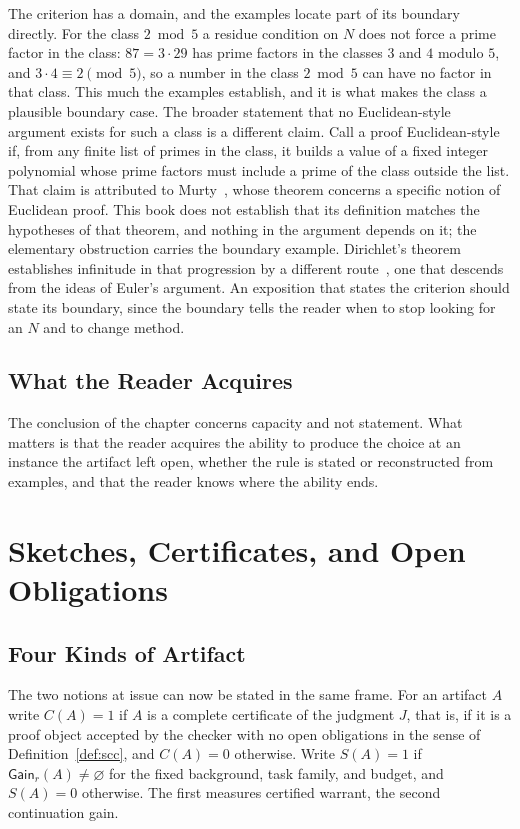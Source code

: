 \documentclass[11pt]{book}
\theoremstyle{definition}
\theoremstyle{remark}
\newcommand{\Gain}{\mathsf{Gain}}
\begin{document}
The criterion has a domain, and the examples locate part of its boundary directly. For the class $2\bmod5$ a residue condition on $N$ does not force a prime factor in the class: $87=3\cdot29$ has prime factors in the classes $3$ and $4$ modulo $5$, and $3\cdot4\equiv2\pmod5$, so a number in the class $2\bmod5$ can have no factor in that class. This much the examples establish, and it is what makes the class a plausible boundary case. The broader statement that no Euclidean-style argument exists for such a class is a different claim. Call a proof Euclidean-style if, from any finite list of primes in the class, it builds a value of a fixed integer polynomial whose prime factors must include a prime of the class outside the list. That claim is attributed to Murty~\cite{murty}, whose theorem concerns a specific notion of Euclidean proof. This book does not establish that its definition matches the hypotheses of that theorem, and nothing in the argument depends on it; the elementary obstruction carries the boundary example. Dirichlet's theorem establishes infinitude in that progression by a different route~\cite{dirichlet}, one that descends from the ideas of Euler's argument. An exposition that states the criterion should state its boundary, since the boundary tells the reader when to stop looking for an $N$ and to change method.

\section{What the Reader Acquires}

The conclusion of the chapter concerns capacity and not statement. What matters is that the reader acquires the ability to produce the choice at an instance the artifact left open, whether the rule is stated or reconstructed from examples, and that the reader knows where the ability ends.

\chapter{Sketches, Certificates, and Open Obligations}\label{ch:six}

\section{Four Kinds of Artifact}

The two notions at issue can now be stated in the same frame. For an artifact $A$ write $C(A)=1$ if $A$ is a complete certificate of the judgment $J$, that is, if it is a proof object accepted by the checker with no open obligations in the sense of Definition~\ref{def:scc}, and $C(A)=0$ otherwise. Write $S(A)=1$ if $\Gain_r(A)\ne\varnothing$ for the fixed background, task family, and budget, and $S(A)=0$ otherwise. The first measures certified warrant, the second continuation gain.
\end{document}
